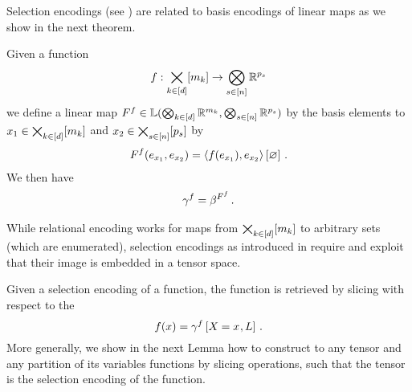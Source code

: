
Selection encodings (see ) are related to basis encodings of linear maps as we show in the next theorem.

\begin{theorem}
    \label{the:selectionToBasisEncoding}
    Given a function
    \[ f : \bigtimes_{k\in[d]}[m_{k}] \rightarrow \bigotimes_{s\in[n]}\mathbb{R}^{p_{s}} \]
    we define a linear map $F^{f}\in\mathbb{L}(\bigotimes_{k\in[d]} \mathbb{R}^{m_{k}},\bigotimes_{s\in[n]}\mathbb{R}^{p_{s}})$ by the basis elements to $x_{1} \in\bigtimes_{k\in[d]}[m_{k}]$ and $x_{2}\in\bigtimes_{s\in[n]}[p_{s}]$ by
    \begin{align*}
        F^{f}(e_{x_{1}},e_{x_{2}})
        = \left\langle f(e_{x_{1}}),e_{x_{2}}\right\rangle \left[ \varnothing \right] \, .
    \end{align*}
    We then have
    \begin{align*}
        \gamma^{f} = \beta^{F^{f}} \, .
    \end{align*}
\end{theorem}




While relational encoding works for maps from $\bigtimes_{k\in[d]}[m_{k}]$ to arbitrary sets (which are enumerated), selection encodings as introduced in  require and exploit that their image is embedded in a tensor space.

Given a selection encoding of a function, the function is retrieved by slicing with respect to the
\[ f(x) = \gamma^{f}\left[X_{}=x_{},L\right] \, . \]
More generally, we show in the next Lemma how to construct to any tensor and any partition of its variables functions by slicing operations, such that the tensor is the selection encoding of the function.

